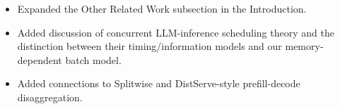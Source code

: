 \changes
\begin{itemize}
    \item Expanded the Other Related Work subsection in the Introduction.
    \item Added discussion of concurrent LLM-inference scheduling theory and the distinction between their timing/information models and our memory-dependent batch model.
    \item Added connections to Splitwise and DistServe-style prefill-decode disaggregation.
\end{itemize}

